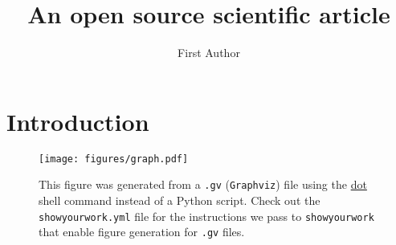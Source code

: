 \documentclass[twocolumn]{aastex631}
\begin{document}
\title{An open source scientific article}

\author{First Author}

\begin{abstract}
    \blindtext
\end{abstract}

\section{Introduction}

\blindtext

\begin{figure}[ht!]
    \begin{centering}
        \texttt{[image: figures/graph.pdf]}
        \caption{
            This figure was generated from a \texttt{.gv} (\texttt{Graphviz}) 
            file using the 
            \href{https://graphviz.org/doc/info/lang.html}{dot} 
            shell command instead of a Python script.
            Check out the \texttt{showyourwork.yml} file for the instructions
            we pass to \texttt{showyourwork} that enable figure generation for
            \texttt{.gv} files.
        }
        \label{fig:graph}
    \end{centering}
\end{figure}
\end{document}
